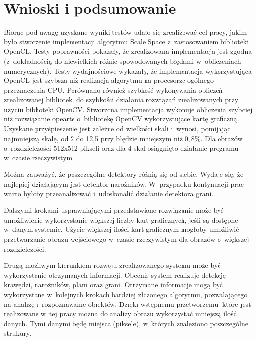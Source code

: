 \chapter{Wnioski i podsumowanie}
\label{cha:podsumowanie}

Biorąc pod uwagę uzyskane wyniki testów udało się zrealizować cel pracy, jakim było stworzenie implementacji algorytmu Scale Space z~zastosowaniem biblioteki OpenCL. Testy poprawności pokazały, że zrealizowana implementacja jest zgodna (z~dokładnością do niewielkich różnic spowodowanych błędami w~obliczeniach numerycznych). Testy wydajnościowe wykazały, że implementacja wykorzystująca OpenCL jest szybsza niż realizacja algorytmu na procesorze ogólnego przeznaczenia CPU. Porównano również szybkość wykonywania obliczeń zrealizowanej biblioteki do szybkości działania rozwiązań zrealizowanych przy użyciu biblioteki OpenCV. Stworzona implementacja wykonuje obliczenia szybciej niż rozwiązanie opearte o~bibliotekę OpenCV wykorzystujące kartę graficzną. Uzyskane przyśpieszenie jest zależne od wielkości skali i~wynosi, pomijając najmniejszą skalę, od 2 do 12,5 przy błędzie mniejszym niż $ 0,8\% $. Dla obrazów o~rozdzielczości 512x512 pikseli oraz dla 4 skal osiągnięto działanie programu w~czasie rzeczywistym.

Można zauważyć, że poszczególne detektory różnią się od siebie. Wydaje się, że najlepiej działającym jest detektor narożników. W~przypadku kontynuacji prac warto byłoby przeanalizować i~udoskonalić działanie detektora grani.

Dalszymi krokami usprawniającymi przedstawione rozwiązanie może być umożliwienie wykorzystanie większej liczby kart graficznych, jeśli są dostępne w~danym systemie. Użycie większej ilości kart graficznym mogłoby umożliwić przetwarzanie obrazu wejściowego w~czasie rzeczywistym dla obrazów o~większej rozdzielczości.

Drugą możliwym kierunkiem rozwoju zrealizowanego systemu może być wykorzystanie otrzymanych informacji. Obecnie system realizuje detekcję krawędzi, narożników, plam oraz grani. Otrzymane informacje mogą być wykorzystane w~kolejnych krokach bardziej złożonego algorytmu, pozwalającego na analizę i~rozpoznawanie obiektów. Dzięki wstępnemu przetworzeniu, które jest realizowane w~tej pracy można do analizy obrazu wykorzystać mniejszą ilość danych. Tymi danymi będę miejsca (piksele), w~których znaleziono poszczególne strukury.
